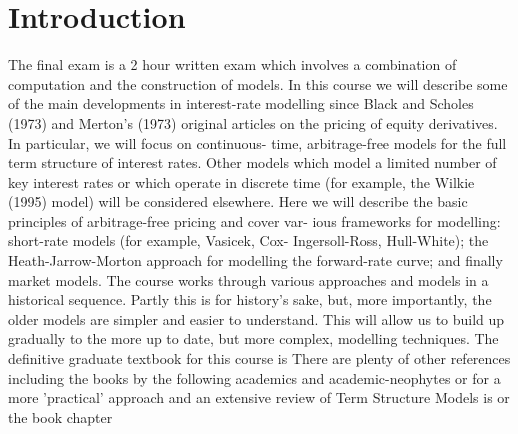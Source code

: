 \section{Introduction}

The final exam is a 2 hour written exam which involves a combination of computation and the construction of 
models. 
In this course we will describe some of the main developments in interest-rate
modelling since Black and Scholes (1973) and Merton's (1973) original articles
on the pricing of equity derivatives. In particular, we will focus on continuous-
time, arbitrage-free models for the full term structure of interest rates. Other
models which model a limited number of key interest rates or which operate in
discrete time (for example, the Wilkie (1995) model) will be considered elsewhere.
Here we will describe the basic principles of arbitrage-free pricing and cover var-
ious frameworks for modelling: short-rate models (for example, Vasicek, Cox-
Ingersoll-Ross, Hull-White); the Heath-Jarrow-Morton approach for modelling
the forward-rate curve; and finally market models.
The course works through various approaches and models in a historical sequence.
Partly this is for history's sake, but, more importantly, the older models are
simpler and easier to understand. This will allow us to build up gradually to the
more up to date, but more complex, modelling techniques.
The definitive graduate textbook for this course is \cite{filipovic2009term}
There are plenty of other references including the books by the following academics 
and academic-neophytes\cite{TSM_Gibson_1999,IRM_Cairns, 
IRM_Brigo_2001,
FinCalc1996_Baxter,InterestRateDynamics}
or for a more 'practical' approach \cite{TermStructureModels} and an extensive review of Term Structure Models 
is \cite{Riccardo_TSM_Review} or the book chapter \cite{ModernRiskManagement}
